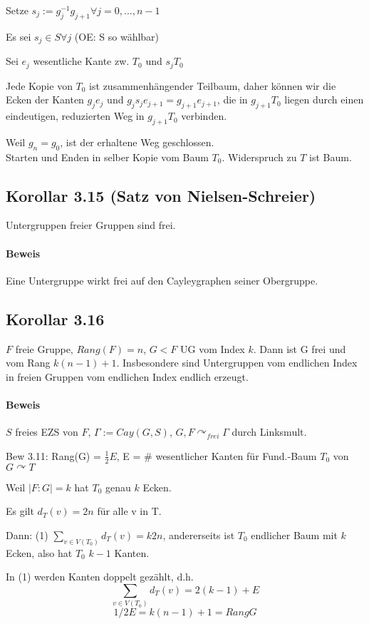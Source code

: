 \documentclass{article}
\begin{document}
Setze $s_j := g_j^{-1}g_{j+1} \forall j= 0, \ldots , n-1$

Es sei $s_j\in S \forall j$ (OE: S so wählbar)

Sei $e_j$ wesentliche Kante zw. $T_0$ und $s_jT_0$

Jede Kopie von $T_0$ ist zusammenhängender Teilbaum, daher können wir die Ecken der Kanten $g_je_j$ und $g_js_je_{j+1} = g_{j+1}e_{j+1}$, die in $g_{j+1}T_0$ liegen durch einen eindeutigen, reduzierten Weg in $g_{j+1}T_0$ verbinden.

Weil $g_n = g_0$, ist der erhaltene Weg geschlossen.\\
Starten und Enden in selber Kopie vom Baum $T_0$. Widerspruch zu $T$ ist Baum.

\subsection{Korollar 3.15 (Satz von Nielsen-Schreier)} Untergruppen freier Gruppen sind frei.
\paragraph{Beweis} Eine Untergruppe wirkt frei auf den Cayleygraphen seiner Obergruppe.

\subsection{Korollar 3.16} $F$ freie Gruppe, $Rang(F) = n$, $G < F$ UG vom Index $k$. Dann ist G frei und vom Rang $k(n-1) + 1$. Insbesondere sind Untergruppen vom endlichen Index in freien Gruppen vom endlichen Index endlich erzeugt.
\paragraph{Beweis} $S$ freies EZS von $F$, $\Gamma:= Cay(G,S)$, $G,F \curvearrowright_{frei} \Gamma$ durch Linksmult.

Bew 3.11: Rang(G) = $\frac{1}{2} E$, E = \# wesentlicher Kanten für Fund.-Baum $T_0$ von $G \curvearrowright T$

Weil $|F:G| = k$ hat $T_0$ genau $k$ Ecken.

Es gilt $d_T(v) = 2n$ für alle v in T.

Dann: (1) $\sum_{v\in V(T_0)} d_T(v) = k 2n$, andererseits ist $T_0$ endlicher Baum mit $k$ Ecken, also hat $T_0$ $k-1$ Kanten.

In (1) werden Kanten doppelt gezählt, d.h.
\[\sum_{v\in V(T_0)}d_T(v) = 2(k-1) + E\]
\[1/2 E = k(n-1) + 1 = Rang G\]
\end{document}
